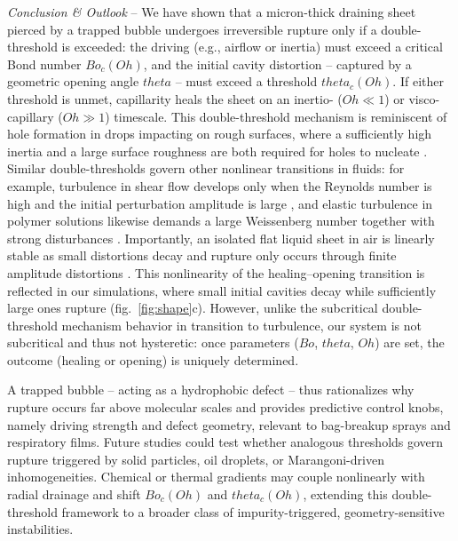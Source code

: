 \documentclass[reprint,amssymb,superscriptaddress,aps,prl,floatfix]{revtex4-2}
\def\theta{theta}%
\begin{document}
{\it Conclusion \& Outlook} --
We have shown that a micron-thick draining sheet pierced by a trapped bubble undergoes
irreversible rupture only if a double-threshold is exceeded: the driving (e.g., airflow or
inertia) must exceed a critical Bond number $Bo_c(Oh)$, and the initial cavity distortion
-- captured by a geometric opening angle $\theta$ -- must exceed a threshold
$\theta_c(Oh)$. If either threshold is unmet, capillarity heals the sheet on an inertio-
($Oh \ll 1$) or visco-capillary ($Oh \gg 1$) timescale. This double-threshold mechanism is
reminiscent of hole formation in drops impacting on rough surfaces, where a sufficiently
high inertia and a large surface roughness are both required for holes to nucleate
\cite{lohse2020double, kim2020raindrop, kolinski2014drops}. Similar double-thresholds govern other nonlinear
transitions in fluids: for example, turbulence in shear flow develops only when the
Reynolds number is high and the initial perturbation amplitude is large
\cite{avila2023transition}, and elastic turbulence in polymer solutions likewise demands a
large Weissenberg number together with strong disturbances \cite{samanta2013elasto}.
Importantly, an isolated flat liquid sheet in air is linearly stable as small distortions
decay and rupture only occurs through finite amplitude distortions \cite{eggers2011subtle,
  wang2015nonlinear, matsuuchi1974modulational, mehring1999nonlinear,
squire1953investigation}. This nonlinearity of the healing--opening transition is
reflected in our simulations, where small initial cavities decay while sufficiently large
ones rupture (fig.~\ref{fig:shape}c). However, unlike the subcritical double-threshold
mechanism behavior in transition to turbulence, our system is not subcritical and thus not hysteretic: once parameters
($Bo$, $\theta$, $Oh$) are set, the outcome (healing or opening) is uniquely determined.

A trapped bubble -- acting as a hydrophobic defect -- thus rationalizes why rupture occurs
far above molecular scales and provides predictive control knobs, namely driving strength
and defect geometry, relevant to bag-breakup sprays and respiratory films. Future studies
could test whether analogous thresholds govern rupture triggered by solid particles, oil
droplets, or Marangoni-driven inhomogeneities. Chemical or thermal gradients may couple
nonlinearly with radial drainage and shift $Bo_c(Oh)$ and $\theta_c(Oh)$, extending this
double-threshold framework to a broader class of impurity-triggered, geometry-sensitive
instabilities.
\end{document}
